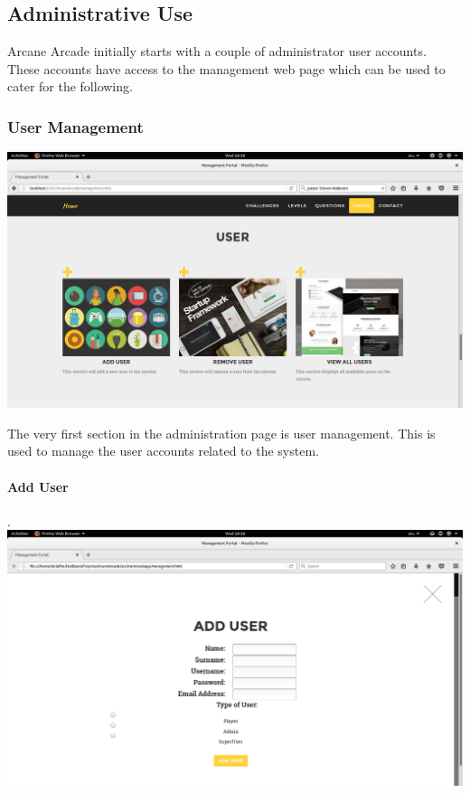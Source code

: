 \documentclass[english]{article}
\begin{document}
		\newpage
		\subsection{Administrative Use}
		Arcane Arcade initially starts with a couple of administrator user accounts. These accounts have access to the management web page which can be used to cater for the following.\newline
			\subsubsection{User Management}
				\includegraphics[width=\linewidth]{User.png}				\newline

				The very first section in the administration page is user management. This is used to manage the user accounts related to the system.
				\\[10pt]\newline
				
				\newpage
				\paragraph{Add User}. \\ \newline
				\includegraphics[width=\linewidth]{AddUser.png}				\newline
\end{document}
